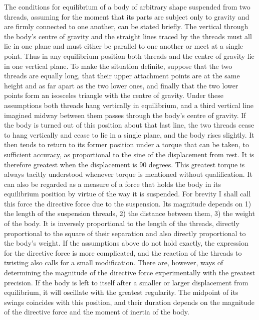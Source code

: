 The conditions for equilibrium of a body of arbitrary shape suspended from two threads, assuming for the moment that its parts are subject only to gravity and are firmly connected to one another, can be stated briefly. The vertical through the body’s centre of gravity and the straight lines traced by the threads must all lie in one plane and must either be parallel to one another or meet at a single point. Thus in any equilibrium position both threads and the centre of gravity lie in one vertical plane. To make the situation definite, suppose that the two threads are equally long, that their upper attachment points are at the same height and as far apart as the two lower ones, and finally that the two lower points form an isosceles triangle with the centre of gravity. Under these assumptions both threads hang vertically in equilibrium, and a third vertical line imagined midway between them passes through the body’s centre of gravity. If the body is turned out of this position about that last line, the two threads cease to hang vertically and cease to lie in a single plane, and the body rises slightly. It then tends to return to its former position under a torque that can be taken, to sufficient accuracy, as proportional to the sine of the displacement from rest. It is therefore greatest when the displacement is 90 degrees. This greatest torque is always tacitly understood whenever torque is mentioned without qualification. It can also be regarded as a measure of a force that holds the body in its equilibrium position by virtue of the way it is suspended. For brevity I shall call this force the directive force due to the suspension. Its magnitude depends on 1) the length of the suspension threads, 2) the distance between them, 3) the weight of the body. It is inversely proportional to the length of the threads, directly proportional to the square of their separation and also directly proportional to the body’s weight. If the assumptions above do not hold exactly, the expression for the directive force is more complicated, and the reaction of the threads to twisting also calls for a small modification. There are, however, ways of determining the magnitude of the directive force experimentally with the greatest precision. If the body is left to itself after a smaller or larger displacement from equilibrium, it will oscillate with the greatest regularity. The midpoint of its swings coincides with this position, and their duration depends on the magnitude of the directive force and the moment of inertia of the body.

